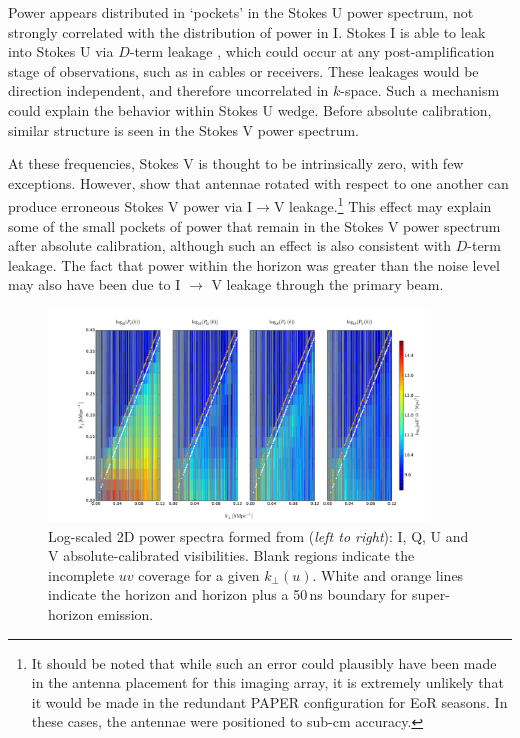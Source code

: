 Power appears distributed in `pockets' in the Stokes U power spectrum, not strongly correlated with the distribution of power in I. Stokes I is able to leak into Stokes U via $D$-term leakage \citep{TMS, Geil.11}, which could occur at any post-amplification stage of observations, such as in cables or receivers. These leakages would be direction independent, and therefore uncorrelated in $k$-space. Such a mechanism could explain the behavior within Stokes U wedge. Before absolute calibration, similar structure is seen in the Stokes V power spectrum.

At these frequencies, Stokes V is thought to be intrinsically zero, with few exceptions. However, \citet{HBS.1.96} show that antennae rotated with respect to one another can produce erroneous Stokes V power via I$\rightarrow$V leakage.\footnote{
It should be noted that while such an error could plausibly have been made in the antenna placement for this imaging array, it is extremely unlikely that it would be made in the redundant PAPER configuration for EoR seasons. In these cases, the antennae were positioned to sub-cm accuracy.} This effect may explain some of the small pockets of power that remain in the Stokes V power spectrum after absolute calibration, although such an effect is also consistent with $D$-term leakage. The fact that power within the horizon was greater than the noise level may also have been due to I $\rightarrow$ V leakage through the primary beam.

\begin{figure}[h!]
\centering
\includegraphics[width=0.9\textwidth]{chapters/eor_window_PAPER/figures/wedges_final_vmin9_greybg.pdf}
\caption[Wedge power spectra from PAPER-32.]{Log-scaled 2D power spectra formed from (\textit{left to right}): I, Q, U and V absolute-calibrated visibilities. Blank regions indicate the incomplete $uv$ coverage for a given $k_{\perp}(u)$. White and orange lines indicate the horizon and horizon plus a 50\,ns boundary for super-horizon emission. }
\label{fig:psa32_wedges}
\end{figure}

